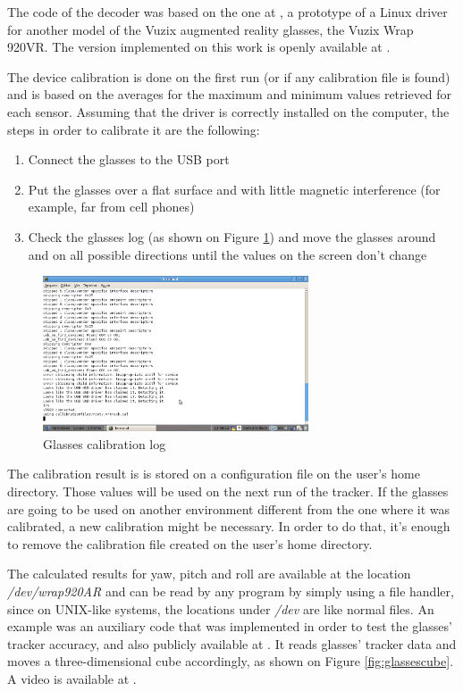 \documentclass[msc, a4paper, classic, en]{ufbathesis}
\begin{document}
The code of the decoder was based on the one at \cite{vuzixdriver}, a prototype of a Linux driver for another model of the Vuzix augmented reality glasses, the Vuzix Wrap 920VR. The version implemented on this work is openly available at \cite{masterproject}.

The device calibration is done on the first run (or if any calibration file is found) and is based on the averages for the maximum and minimum values retrieved for each sensor. Assuming that the driver is correctly installed on the computer, the steps in order to calibrate it are the following:

\begin{enumerate}
  \item Connect the glasses to the USB port
  \item Put the glasses over a flat surface and with little magnetic interference (for example, far from cell phones)
  \item Check the glasses log (as shown on Figure \ref{fig:glasseslog}) and move the glasses around and on all possible directions until the values on the screen don't change
\end{enumerate}

\begin{figure}
\centering
\includegraphics[width=0.7\textwidth]{images/glasseslog.png}
\caption{Glasses calibration log}
\label{fig:glasseslog}
\end{figure}

The calibration result is is stored on a configuration file on the user's home directory. Those values will be used on the next run of the tracker. If the glasses are going to be used on another environment different from the one where it was calibrated, a new calibration might be necessary. In order to do that, it's enough to remove the calibration file created on the user's home directory.

The calculated results for yaw, pitch and roll are available at the location \textit{/dev/wrap920AR} and can be read by any program by simply using a file handler, since on UNIX-like systems, the locations under \textit{/dev} are like normal files. An example was an auxiliary code that was implemented in order to test the glasses' tracker accuracy, and also publicly available at \cite{masterproject}. It reads glasses' tracker data and moves a three-dimensional cube accordingly, as shown on Figure \ref{fig:glassescube}. A video is available at \cite{videos}.
\end{document}
